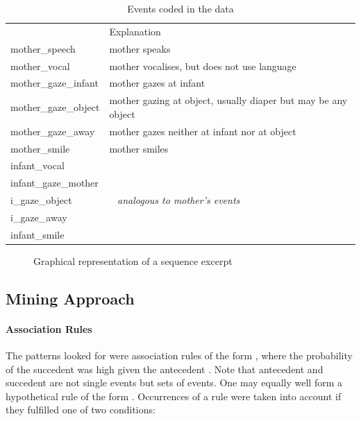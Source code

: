 \begin{table}[h]
	\centering
	\begin{tabularx}{\textwidth}{>{\ttfamily}lX} 
		\toprule
		{\rmfamily Event}		& Explanation \\
		\cmidrule(lr){1-1} \cmidrule(lr){2-2}
		mother\_speech			& mother speaks \\
		mother\_vocal			& mother vocalises, but does not use language \\
		mother\_gaze\_infant	& mother gazes at infant \\
		mother\_gaze\_object	& mother gazing at object, usually diaper but may be any object \\
		mother\_gaze\_away		& mother gazes neither at infant nor at object \\
		mother\_smile			& mother smiles \\
		\cmidrule(lr){1-1} \cmidrule(lr){2-2}
		infant\_vocal \\
		infant\_gaze\_mother \\
		i\_gaze\_object			& ~ \hfill \textit{analogous to mother's events} \hfill ~ \\
		i\_gaze\_away \\
		infant\_smile \\
		\bottomrule
	\end{tabularx}
	\caption{Events coded in the data}
	\label{tab:events}
\end{table}

\begin{figure}
	\centering
	
	\caption{Graphical representation of a sequence excerpt}
	\label{fig:idealseq}
\end{figure}

\subsection{Mining Approach}
\label{ssec:miningmethodapproach}

\paragraph{Association Rules}
The patterns \citet{rohlfing18} looked for were association rules of the form , where the probability of the succedent  was high given the antecedent . Note that antecedent and succedent are not single events but sets of events. One may equally well form a hypothetical rule of the form . Occurrences of a rule were taken into account if they fulfilled one of two conditions:


